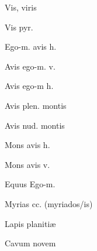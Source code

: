  {\mktsStyleItalic{}Vis\/}, viris


 {\mktsStyleItalic{}Vis pyr.\/}


 {} {\mktsStyleItalic{}Ego-m. avis h.\/}


 {} {\mktsStyleItalic{}Avis ego-m. v.\/}


 {} {\mktsStyleItalic{}Avis ego-m h.\/}


 {} {\mktsStyleItalic{}Avis plen. montis\/}


 {} {\mktsStyleItalic{}Avis nud. montis\/}


 {} {\mktsStyleItalic{}Mons avis h.\/}


 {} {\mktsStyleItalic{}Mons avis v.\/}


 {\mktsStyleItalic{}Equus Ego-m.\/}


 {\mktsStyleItalic{}Myrias cc.\/} (myriados/is)


 {} {\mktsStyleItalic{}Lapis planitiæ\/}


 {} {\mktsStyleItalic{}Cavum novem\/}


